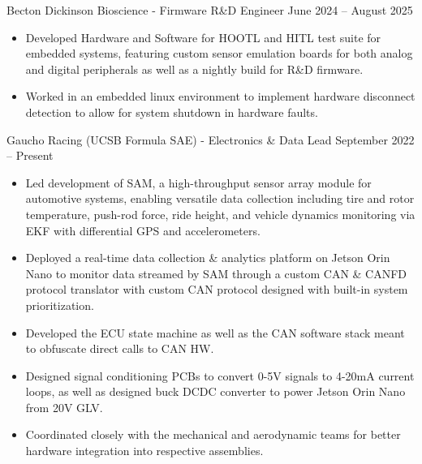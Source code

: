 \documentclass[9pt]{developercv} %
\begin{document}
\vspace{-15 pt}
\begin{entrylist}
    \entry
        {}
        {Becton Dickinson Bioscience - Firmware R\&D Engineer}
        {June 2024 – August 2025}
        {\vspace{-12pt}
        \begin{itemize}[noitemsep,topsep=0pt,parsep=0pt,partopsep=0pt, leftmargin=10pt]
            \item Developed Hardware and Software for HOOTL and HITL test suite for embedded systems, featuring custom sensor emulation boards for both analog and digital peripherals as well as a nightly build for R\&D firmware.
            \item Worked in an embedded linux environment to implement hardware disconnect detection to allow for system shutdown in hardware faults.
        \end{itemize}}
    \entry
        {}
        {Gaucho Racing (UCSB Formula SAE) - Electronics \& Data Lead}
        {September 2022 – Present}
        {\vspace{-12pt}
        \begin{itemize}[noitemsep,topsep=0pt,parsep=0pt,partopsep=0pt, leftmargin=10pt]
            \item Led development of SAM, a high-throughput sensor array module for automotive systems, enabling versatile data collection including tire and rotor temperature, push-rod force, ride height, and vehicle dynamics monitoring via EKF with differential GPS and accelerometers.
            \item Deployed a real-time data collection \& analytics platform on Jetson Orin Nano to monitor data streamed by SAM through a custom CAN \& CANFD protocol translator with custom CAN protocol designed with built-in system prioritization.
            \item Developed the ECU state machine as well as the CAN software stack meant to obfuscate direct calls to CAN HW.
            \item Designed signal conditioning PCBs to convert 0-5V signals to 4-20mA current loops, as well as designed buck DCDC converter to power Jetson Orin Nano from 20V GLV.
            \item Coordinated closely with the mechanical and aerodynamic teams for better hardware integration into respective assemblies.

        \end{itemize}}
\end{entrylist}
\end{document}
